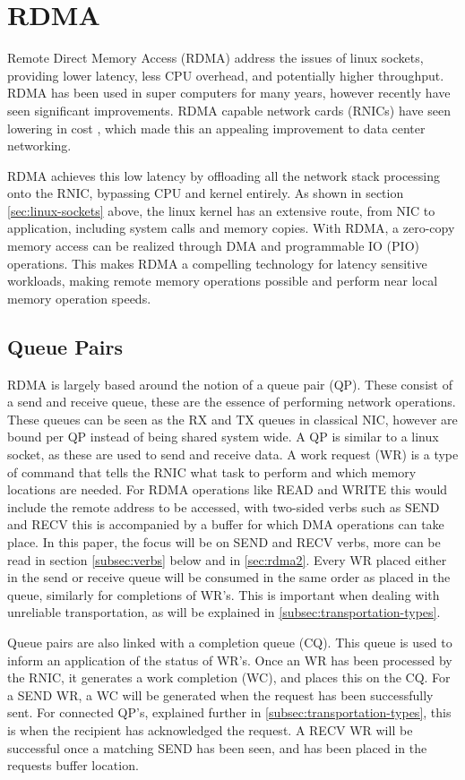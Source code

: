 \section[RDMA]{RDMA}\label{sec:rdma}
Remote Direct Memory Access (RDMA) address the issues of linux sockets, providing lower latency, less CPU overhead, and potentially higher throughput.
RDMA has been used in super computers for many years, however recently have seen significant improvements.
RDMA capable network cards (RNICs) have seen lowering in cost \cite{kalia2016design}, which made this an appealing improvement to data center networking.

RDMA achieves this low latency by offloading all the network stack processing onto the RNIC, bypassing CPU and kernel entirely.
As shown in section \ref{sec:linux-sockets} above, the linux kernel has an extensive route, from NIC to application, including system calls and memory copies.
With RDMA, a zero-copy memory access can be realized through DMA and programmable IO (PIO) operations.
This makes RDMA a compelling technology for latency sensitive workloads, making remote memory operations possible and perform near local memory operation speeds.

\subsection{Queue Pairs}\label{subsec:queue-pairs}
RDMA is largely based around the notion of a queue pair (QP).
These consist of a send and receive queue, these are the essence of performing network operations.
These queues can be seen as the RX and TX queues in classical NIC, however are bound per QP instead of being shared system wide.
A QP is similar to a linux socket, as these are used to send and receive data.
A work request (WR) is a type of command that tells the RNIC what task to perform and which memory locations are needed.
For RDMA operations like READ and WRITE this would include the remote address to be accessed, with two-sided verbs such as SEND and RECV this is accompanied by a buffer for which DMA operations can take place.
In this paper, the focus will be on SEND and RECV verbs, more can be read in section \ref{subsec:verbs} below and in \ref{sec:rdma2}.
Every WR placed either in the send or receive queue will be consumed in the same order as placed in the queue, similarly for completions of WR's.
This is important when dealing with unreliable transportation, as will be explained in \ref{subsec:transportation-types}.

Queue pairs are also linked with a completion queue (CQ).
This queue is used to inform an application of the status of WR's.
Once an WR has been processed by the RNIC, it generates a work completion (WC), and places this on the CQ.
For a SEND WR, a WC will be generated when the request has been successfully sent.
For connected QP's, explained further in \ref{subsec:transportation-types}, this is when the recipient has acknowledged the request.
A RECV WR will be successful once a matching SEND has been seen, and has been placed in the requests buffer location.

